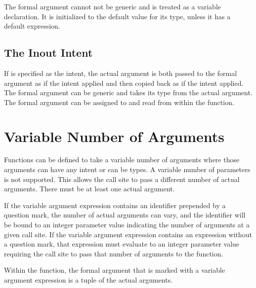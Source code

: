 The formal argument cannot not be generic and is treated as a variable
declaration. It is initialized to the default value for its type,
unless it has a default expression.

\subsection{The Inout Intent}
\label{The_Inout_Intent}

If  is specified as the intent, the actual argument is
both passed to the formal argument as if the  intent applied
and then copied back as if the  intent applied.  The formal
argument can be generic and takes its type from the actual argument.
The formal argument can be assigned to and read from within the
function.


\section{Variable Number of Arguments}
\label{Variable_Length_Argument_Lists}

Functions can be defined to take a variable number of arguments where
those arguments can have any intent or can be types.  A variable
number of parameters is not supported.  This allows the call site to
pass a different number of actual arguments.  There must be at least
one actual argument.

If the variable argument expression contains an identifier prepended by a
question mark, the number of actual arguments can vary, and the identifier
will be bound to an integer parameter value indicating the number of
arguments at a given call site.
If the variable argument expression contains an expression without
a question mark, that expression must evaluate to an integer parameter value
requiring the call site to pass that number of arguments to the
function.

Within the function, the formal argument that is marked with a
variable argument expression is a tuple of the actual
arguments.

